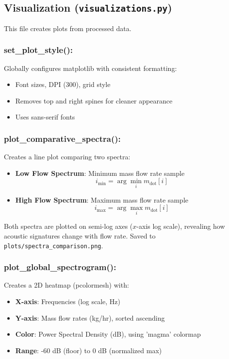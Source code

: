 \subsection{Visualization (\texttt{visualizations.py})}

This file creates plots from processed data.

\subsubsection{set\_plot\_style():}
Globally configures matplotlib with consistent formatting:
\begin{itemize}
    \item Font sizes, DPI (300), grid style
    \item Removes top and right spines for cleaner appearance
    \item Uses sans-serif fonts
\end{itemize}

\subsubsection{plot\_comparative\_spectra():}

Creates a line plot comparing two spectra:
\begin{itemize}
    \item \textbf{Low Flow Spectrum}: Minimum mass flow rate sample
    \begin{equation}\label{low_flow_spectrum}
        i_{\min} = \arg\min_i m_{\text{dot}}[i]
    \end{equation}
    
    \item \textbf{High Flow Spectrum}: Maximum mass flow rate sample
    \begin{equation}\label{high_flow_spectrum}
        i_{\max} = \arg\max_i m_{\text{dot}}[i]
    \end{equation}
\end{itemize}

Both spectra are plotted on semi-log axes ($x$-axis log scale), revealing how acoustic signatures 
change with flow rate. Saved to \verb|plots/spectra_comparison.png|.

\subsubsection{plot\_global\_spectrogram():}

Creates a 2D heatmap (pcolormesh) with:
\begin{itemize}
    \item \textbf{X-axis}: Frequencies (log scale, Hz)
    \item \textbf{Y-axis}: Mass flow rates (kg/hr), sorted ascending
    \item \textbf{Color}: Power Spectral Density (dB), using 'magma' colormap
    \item \textbf{Range}: -60 dB (floor) to 0 dB (normalized max)
\end{itemize}

